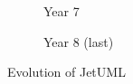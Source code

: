 \begin{figure}[ht]
    \medskip
    \begin{subfigure}{0.48\textwidth}
        \caption{Year 7} 
        \label{fig:JetUML_V3S7}
    \end{subfigure}\hspace*{\fill}
    \begin{subfigure}{0.48\textwidth}
        \caption{Year 8 (last)} 
        \label{fig:JetUML_V3S8}
    \end{subfigure}
    
    \caption{Evolution of JetUML} 
    \label{fig:JetUML_V3_F1}
\end{figure}

\clearpage
